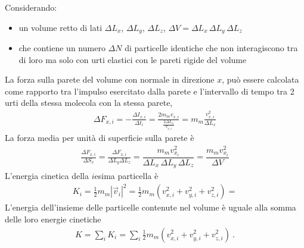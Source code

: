 \documentclass[letterpaper,10pt,italian]{jupyterBook}
\begin{document}
\sphinxAtStartPar
Considerando: 
\begin{itemize}
\item {} 
\sphinxAtStartPar
un volume retto di lati \(\Delta L_x\), \(\Delta L_y\), \(\Delta L_z\), \(\Delta V = \Delta L_x \, \Delta L_y \, \Delta L_z\)

\item {} 
\sphinxAtStartPar
che contiene un numero \(\Delta N\) di particelle identiche che non interagiscono tra di loro ma solo con urti elastici con le pareti rigide del volume

\end{itemize}

\sphinxAtStartPar
La forza sulla parete del volume con normale in direzione \(x\), può essere calcolata come rapporto tra l’impulso esercitato dalla parete e l’intervallo di tempo tra 2 urti della stessa molecola con la stessa parete,
\begin{equation*}
\begin{split}\Delta F_{x,i} = -\frac{\Delta I_{x,i}}{\Delta t_i} = \frac{2 m_m v_{x,i}}{\frac{2 \Delta L_x}{v_{x,i}}} = m_m \frac{v_{x,i}^2}{\Delta L_x}\end{split}
\end{equation*}
\sphinxAtStartPar
La forza media per unità di superficie sulla parete è
\begin{equation*}
\begin{split}\frac{\Delta F_{x,i}}{\Delta S_x} = \frac{\Delta F_{x,i}}{\Delta L_y \Delta L_z} = \dfrac{m_m v_{x_i}^2}{\Delta L_x \, \Delta L_y \, \Delta L_z} = \dfrac{m_m v_{x_i}^2}{\Delta V}\end{split}
\end{equation*}
\sphinxAtStartPar
L’energia cinetica della \(i\)\sphinxhyphen{}esima particella è
\begin{equation*}
\begin{split}
K_i = \frac{1}{2} m_m |\vec{v}_i|^2 = 
\frac{1}{2} m_m \left( v_{x,i}^2 + v_{y,i}^2 + v_{z,i}^2  \right) = 
\end{split}
\end{equation*}
\sphinxAtStartPar
L’energia dell’insieme delle particelle contenute nel volume è uguale alla somma delle loro energie cinetiche
\begin{equation*}
\begin{split}K = \sum_i K_i = \sum_i \frac{1}{2} m_m \left( v_{x,i}^2 + v_{y,i}^2 + v_{z,i}^2 \right) \ .\end{split}
\end{equation*}
\end{document}
